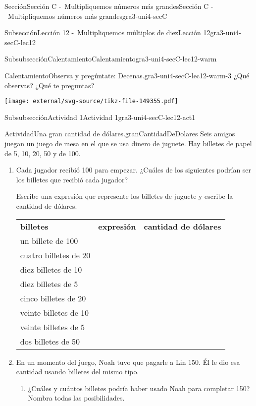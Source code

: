 \documentclass[twoside,14pt,]{extarticle}
\newcommand{\tabularfont}{\relax}
\newcommand{\hrulethick} {\noalign{\hrule height 0.11em}}
\begin{document}
\begin{sectionptx}{Sección}{Sección C -~Multipliquemos números más grandes}{}{Sección C -~Multipliquemos números más grandes}{}{}{gra3-uni4-secC}
\begin{subsectionptx}{Subsección}{Lección 12 -~Multipliquemos múltiplos de diez}{}{Lección 12}{}{}{gra3-uni4-secC-lec12}
\begin{subsubsectionptx}{Subsubsección}{Calentamiento}{}{Calentamiento}{}{}{gra3-uni4-secC-lec12-warm}
\begin{exploration}{Calentamiento}{Observa y pregúntate: Decenas.}{gra3-uni4-secC-lec12-warm-3}%
¿Qué observas? ¿Qué te preguntas?%
\begin{image}{0}{1}{0}{}%
\texttt{[image: external/svg-source/tikz-file-149355.pdf]}
\end{image}%
\end{exploration}%
\end{subsubsectionptx}
%
%
\typeout{************************************************}
\typeout{************************************************}
%
\begin{subsubsectionptx}{Subsubsección}{Actividad 1}{}{Actividad 1}{}{}{gra3-uni4-secC-lec12-act1}
\begin{activity}{Actividad}{Una gran cantidad de dólares.}{granCantidadDeDolares}%
Seis amigos juegan un juego de mesa en el que se usa dinero de juguete. Hay billetes de papel de \textdollar{}5, \textdollar{}10, \textdollar{}20, \textdollar{}50 y de \textdollar{}100.%
%
\begin{enumerate}
\item{}Cada jugador recibió \textdollar{}100 para empezar. ¿Cuáles de los siguientes podrían ser los billetes que recibió cada jugador?%
\par
Escribe una expresión que represente los billetes de juguete y escribe la cantidad de dólares.%
\begin{center}%
{\tabularfont%
\begin{tabular}{lll}
{\bfseries{}billetes}&{\bfseries{}expresión}&{\bfseries{}cantidad de dólares}\tabularnewline\hrulethick
un billete de \textdollar{}100&&\tabularnewline[0pt]
cuatro billetes de \textdollar{}20&&\tabularnewline[0pt]
diez billetes de \textdollar{}10&&\tabularnewline[0pt]
diez billetes de \textdollar{}5&&\tabularnewline[0pt]
cinco billetes de \textdollar{}20&&\tabularnewline[0pt]
veinte billetes de \textdollar{}10&&\tabularnewline[0pt]
veinte billetes de \textdollar{}5&&\tabularnewline[0pt]
dos billetes de \textdollar{}50&&
\end{tabular}
}%
\end{center}%
\item{}En un momento del juego, Noah tuvo que pagarle a Lin \textdollar{}150. Él le dio esa cantidad usando billetes del mismo tipo.%
%
\begin{enumerate}
\item{}¿Cuáles y cuántos billetes podría haber usado Noah para completar \textdollar{}150? Nombra todas las posibilidades.%

\end{enumerate}
\end{enumerate}
\end{activity}
\end{subsubsectionptx}
\end{subsectionptx}
\end{sectionptx}
\end{document}
